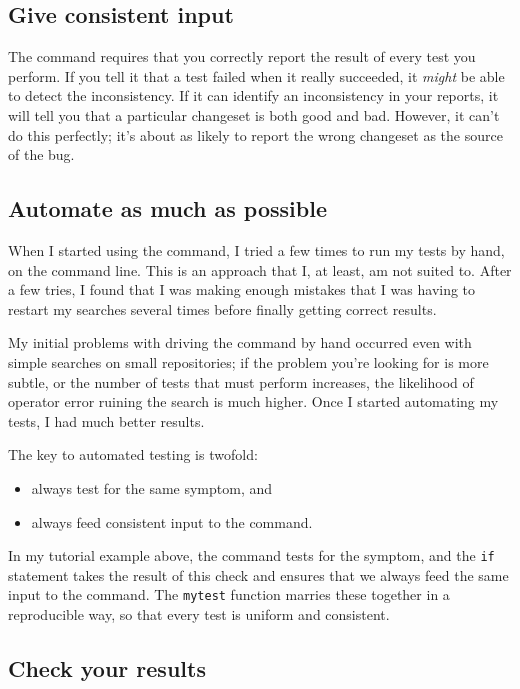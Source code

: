 \subsection{Give consistent input}

The  command requires that you correctly report the
result of every test you perform.  If you tell it that a test failed
when it really succeeded, it \emph{might} be able to detect the
inconsistency.  If it can identify an inconsistency in your reports,
it will tell you that a particular changeset is both good and bad.
However, it can't do this perfectly; it's about as likely to report
the wrong changeset as the source of the bug.

\subsection{Automate as much as possible}

When I started using the  command, I tried a few times
to run my tests by hand, on the command line.  This is an approach
that I, at least, am not suited to.  After a few tries, I found that I
was making enough mistakes that I was having to restart my searches
several times before finally getting correct results.

My initial problems with driving the  command by hand
occurred even with simple searches on small repositories; if the
problem you're looking for is more subtle, or the number of tests that
 must perform increases, the likelihood of operator
error ruining the search is much higher.  Once I started automating my
tests, I had much better results.

The key to automated testing is twofold:
\begin{itemize}
\item always test for the same symptom, and
\item always feed consistent input to the  command.
\end{itemize}
In my tutorial example above, the  command tests for the
symptom, and the \texttt{if} statement takes the result of this check
and ensures that we always feed the same input to the 
command.  The \texttt{mytest} function marries these together in a
reproducible way, so that every test is uniform and consistent.

\subsection{Check your results}

